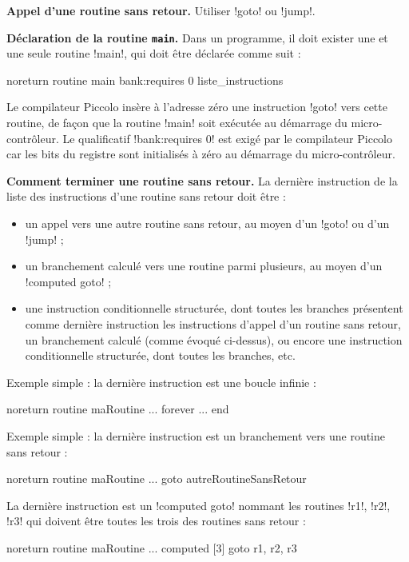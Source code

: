 \textbf{Appel d’une routine sans retour.} Utiliser \pic!goto! ou \pic!jump!.


\textbf{Déclaration de la routine \texttt{main}.} Dans un programme, il doit exister une et une seule routine \pic!main!, qui doit être déclarée comme suit :

\begin{piccolo}
noreturn routine main bank:requires 0 {
   liste_instructions
}

\end{piccolo}

Le compilateur Piccolo insère à l’adresse zéro une instruction \pic!goto! vers cette routine, de façon que la routine \pic!main! soit exécutée au démarrage du micro-contrôleur. Le qualificatif \pic!bank:requires 0! est exigé par le compilateur Piccolo car les bits  du registre  sont initialisés à zéro au démarrage du micro-contrôleur.


\textbf{Comment terminer une routine sans retour.} La dernière instruction de la liste des instructions d’une routine sans retour doit être :
\begin{itemize}
  \item un appel vers une autre routine sans retour, au moyen d’un \pic!goto! ou d'un \pic!jump! ;
  \item un branchement calculé vers une routine parmi plusieurs, au moyen d’un \pic!computed goto! ;
  \item une instruction conditionnelle structurée, dont toutes les branches présentent comme dernière instruction les instructions d’appel d’un routine sans retour, un branchement calculé (comme évoqué ci-dessus), ou encore une instruction conditionnelle structurée, dont toutes les branches, etc.

\end{itemize}

Exemple simple : la dernière instruction est une boucle infinie :
\begin{piccolo}
noreturn routine maRoutine {
  ...
  forever
    ...
  end
}
\end{piccolo}

Exemple simple : la dernière instruction est un branchement vers une routine sans retour :
\begin{piccolo}
noreturn routine maRoutine {
  ...
  goto autreRoutineSansRetour
}
\end{piccolo}

La dernière instruction est un \pic!computed goto! nommant les routines \pic!r1!, \pic!r2!, \pic!r3! qui doivent être toutes les trois des routines sans retour :
\begin{piccolo}
noreturn routine maRoutine {
  ...
  computed [3] goto r1, r2, r3
}
\end{piccolo}

